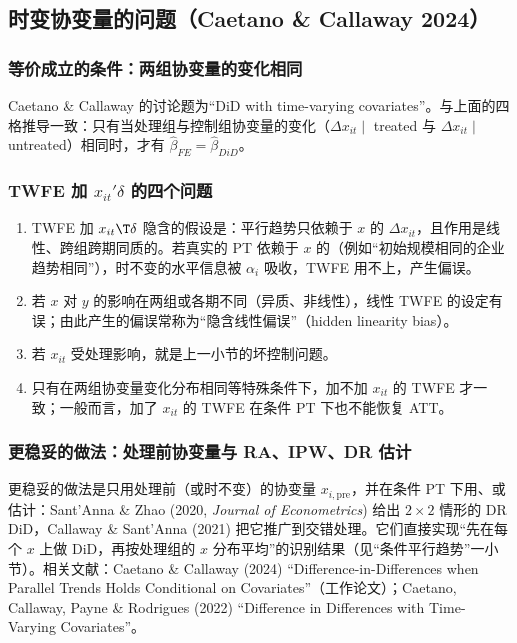 \subsection{时变协变量的问题（Caetano \& Callaway 2024）}

\subsubsection{等价成立的条件：两组协变量的变化相同}

Caetano \& Callaway 的讨论题为“DiD with time-varying covariates”。与上面的四格推导一致：只有当处理组与控制组协变量的变化（$\Delta x_{it}\mid$ treated 与 $\Delta x_{it}\mid$ untreated）相同时，才有 $\hat\beta_{FE}=\hat\beta_{DiD}$。

\subsubsection{TWFE 加 \texorpdfstring{$x_{it}'\delta$}{x'delta} 的四个问题}

\begin{enumerate}
  \item TWFE 加 $x_{it}\T\delta$ 隐含的假设是：平行趋势只依赖于 $x$ 的 $\Delta x_{it}$，且作用是线性、跨组跨期同质的。若真实的 PT 依赖于 $x$ 的（例如“初始规模相同的企业趋势相同”），时不变的水平信息被 $\alpha_i$ 吸收，TWFE 用不上，产生偏误。
  \item 若 $x$ 对 $y$ 的影响在两组或各期不同（异质、非线性），线性 TWFE 的设定有误；由此产生的偏误常称为“隐含线性偏误”（hidden linearity bias）。
  \item 若 $x_{it}$ 受处理影响，就是上一小节的坏控制问题。
  \item 只有在两组协变量变化分布相同等特殊条件下，加不加 $x_{it}$ 的 TWFE 才一致；一般而言，加了 $x_{it}$ 的 TWFE 在条件 PT 下也不能恢复 ATT。
\end{enumerate}

\subsubsection{更稳妥的做法：处理前协变量与 RA、IPW、DR 估计}

\begin{extend}[条件平行趋势下的估计]
更稳妥的做法是只用处理前（或时不变）的协变量 $x_{i,\mathrm{pre}}$，并在条件 PT 下用、或估计：Sant'Anna \& Zhao (2020, \textit{Journal of Econometrics}) 给出 $2\times2$ 情形的 DR DiD，Callaway \& Sant'Anna (2021) 把它推广到交错处理。它们直接实现“先在每个 $x$ 上做 DiD，再按处理组的 $x$ 分布平均”的识别结果（见“条件平行趋势”一小节）。相关文献：Caetano \& Callaway (2024) “Difference-in-Differences when Parallel Trends Holds Conditional on Covariates”（工作论文）；Caetano, Callaway, Payne \& Rodrigues (2022) “Difference in Differences with Time-Varying Covariates”。
\end{extend}

